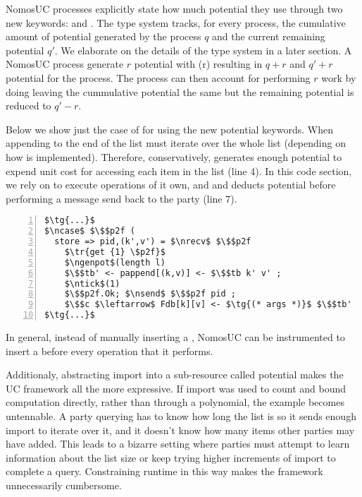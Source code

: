 NomosUC processes explicitly state how much potential they use through two new keywords: \inline{$\ngenpot$} and \inline{$\ntick$}.
The type system tracks, for every process, the cumulative amount of potential generated by the process $q$ and the current remaining potential $q'$. We elaborate on the details of the type system in a later section.
A NomosUC process generate $r$ potential with \inline{$\ngenpot$}(r) resulting in $q+r$ and $q'+r$ potential for the process. 
The process can then account for performing $r$ work by doing  leaving the cummulative potential the same but the remaining potential is reduced to $q'-r$.

Below we show just the case of  for \Fdb using the new potential keywords. 
When appending to the end of the list \Fdb must iterate over the whole list (depending on how  is implemented).
Therefore, conservatively, \Fdb generates enough potential to expend unit cost for accessing each item in the list (line 4).
In this code section, we rely on  to execute \inline{$\ntick$} operations of it own, and \Fdb and deducts potential before performing a message send back to the party (line 7).
\begin{lstlisting}[basicstyle=\scriptsize\BeraMonottFamily, frame=single, mathescape, numbers=left, xleftmargin=2em, xrightmargin=2em]
$\tg{...}$
$\ncase$ $\$$p2f (
  store => pid,(k',v') = $\nrecv$ $\$$p2f
    $\tr{get {1} \$p2f}$
    $\ngenpot$(length l)
    $\$$tb' <- pappend[(k,v)] <- $\$$tb k' v' ;
    $\ntick$(1)
    $\$$p2f.Ok; $\nsend$ $\$$p2f pid ;
    $\$$c $\leftarrow$ Fdb[k][v] <- $\tg{(* args *)}$ $\$$tb'
$\tg{...}$
\end{lstlisting}
In general, instead of manually inserting a \itick, NomosUC can be instrumented to insert a \itick before every operation that it performs. 

Additionaly, abstracting import into a sub-resource called potential makes the UC framework all the more expressive.
If import was used to count and bound computation directly, rather than through a polynomial, the \Fdb example becomes untennable. 
A party querying \Fdb has to know how long the list is so it sends enough import to iterate over it, and it doesn't know how many items other parties may have added.
This leads to a bizarre setting where parties must attempt to learn information about the list size or keep trying higher increments of import to complete a query.
Constraining runtime in this way makes the framework unnecessarily cumbersome.

